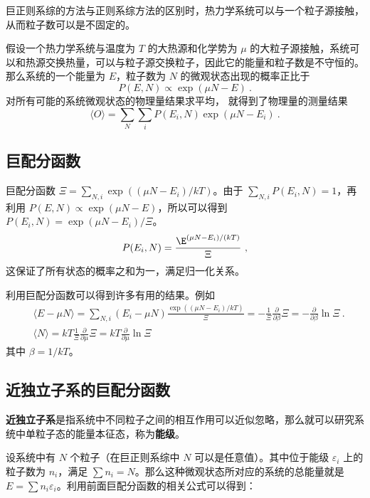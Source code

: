 

巨正则系综的方法与正则系综方法的区别时，热力学系统可以与一个粒子源接触，从而粒子数可以是不固定的。

假设一个热力学系统与温度为 $T$ 的大热源和化学势为 $\mu$ 的大粒子源接触，系统可以和热源交换热量，可以与粒子源交换粒子，因此它的能量和粒子数是不守恒的。那么系统的一个能量为 $E$，粒子数为 $N$ 的微观状态出现的概率正比于
\begin{equation}
P(E,N)\propto \exp(\mu N-E)~.
\end{equation}
对所有可能的系统微观状态的物理量结果求平均， 就得到了物理量的测量结果
\begin{equation}
\langle O\rangle=\sum_{N}\sum_i P(E_i,N)\exp(\mu N-E_i)~.
\end{equation}


\subsection{巨配分函数}
巨配分函数 $\Xi=\sum_{N,i} \exp((\mu N-E_i)/kT)$。由于 $\sum_{N,i} P(E_i,N)=1$，再利用 $P(E,N)\propto \exp(\mu N-E)$，所以可以得到 $P(E_i,N)=\exp(\mu N-E_i)/\Xi$。
\begin{equation}
P(E_i,N)=\frac{\E^{(\mu N - E_i)/(kT)}}{\Xi}~,
\end{equation}
这保证了所有状态的概率之和为一，满足归一化关系。

利用巨配分函数可以得到许多有用的结果。例如
\begin{equation}\label{eq_MCEsb_1}
\begin{aligned}
&\langle E-\mu N\rangle = \sum_{N,i} (E_i-\mu N) \frac{\exp((\mu N - E_i)/kT)}{\Xi}=-\frac{1}{\Xi}\frac{\partial }{\partial \beta}\Xi=-\frac{\partial}{\partial\beta} \ln \Xi~.\\
&\langle N\rangle =kT \frac{1}{\Xi} \frac{\partial}{\partial \mu}\Xi=kT\frac{\partial}{\partial \mu}\ln \Xi
\end{aligned}
\end{equation}
其中 $\beta=1/kT$。
\subsection{近独立子系的巨配分函数}
\textbf{近独立子系}是指系统中不同粒子之间的相互作用可以近似忽略，那么就可以研究系统中单粒子态的能量本征态，称为\textbf{能级}。

设系统中有 $N$ 个粒子（在巨正则系综中 $N$ 可以是任意值）。其中位于能级 $\varepsilon_i$ 上的粒子数为 $n_i$，满足 $\sum n_i=N$。那么这种微观状态所对应的系统的总能量就是 $E=\sum n_i \varepsilon_i$。利用前面巨配分函数的相关公式可以得到：

